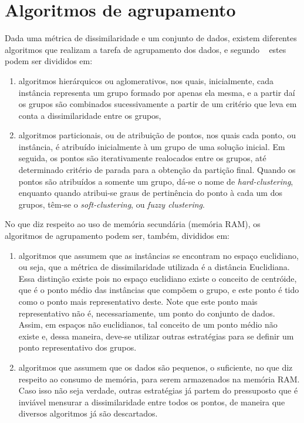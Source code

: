 \section{Algoritmos de agrupamento}

Dada uma métrica de dissimilaridade e um conjunto de dados, existem diferentes algoritmos que realizam a tarefa de agrupamento dos dados, e segundo ~\parencite[][243]{Ullman} estes podem ser divididos em:

\begin{enumerate}
	\item  algoritmos hierárquicos ou aglomerativos, nos quais, inicialmente, cada instância representa um grupo formado por apenas ela mesma, e a partir daí os grupos são combinados sucessivamente a partir de um critério que leva em conta a dissimilaridade entre os grupos,
	\item algoritmos particionais, ou de atribuição de pontos, nos quais cada ponto, ou instância, é atribuído inicialmente à um grupo de uma solução inicial. Em seguida, os pontos são iterativamente realocados entre os grupos, até determinado critério de parada para a obtenção da partição final. Quando os pontos são atribuídos a somente um grupo, dá-se o nome de \emph{hard-clustering}, enquanto quando atribui-se graus de pertinência do ponto à cada um dos grupos, têm-se o \emph{soft-clustering}, ou \emph{fuzzy clustering}.
\end{enumerate}
No que diz respeito ao uso de memória secundária (memória RAM), os algoritmos de agrupamento podem ser, também, divididos em:

\begin{enumerate}
	\item algoritmos que assumem que as instâncias se encontram no espaço euclidiano, ou seja, que a métrica de dissimilaridade utilizada é a distância Euclidiana. Essa distinção existe pois no espaço euclidiano existe o conceito de centróide, que é o ponto médio das instâncias que compõem o grupo, e este ponto é tido como o ponto mais representativo deste. Note que este ponto mais representativo não é, necessariamente, um ponto do conjunto de dados. Assim, em espaços não euclidianos, tal conceito de um ponto médio não existe e, dessa maneira, deve-se utilizar outras estratégias para se definir um ponto representativo dos grupos.
	\item algoritmos que assumem que os dados são pequenos, o suficiente, no que diz respeito ao consumo de memória, para serem armazenados na memória RAM. Caso isso não seja verdade, outras estratégias já partem do pressuposto que é inviável mensurar a dissimilaridade entre todos os pontos, de maneira que diversos algoritmos já são descartados. 
\end{enumerate}

